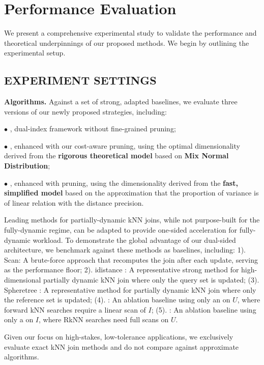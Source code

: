 \section{Performance Evaluation} \label{sec:exp}
We present a comprehensive experimental study to validate the performance and theoretical underpinnings of our proposed methods. We begin by outlining the experimental setup.

\subsection{EXPERIMENT SETTINGS}

\noindent \textbf{Algorithms.} Against a set of strong, adapted baselines, we evaluate three versions of our newly proposed strategies, including:

\noindent $\bullet$ \textbf{\dualtree},  dual-index framework without fine-grained pruning;

\noindent $\bullet$ \textbf{\dualtreeopt}, \dualtree enhanced with our cost-aware pruning, using the optimal dimensionality derived from the \textbf{rigorous theoretical model} based on \textbf{Mix Normal Distribution};

\noindent $\bullet$ \textbf{\dualtreefast}, \dualtree enhanced with pruning, using the dimensionality derived from the \textbf{fast, simplified model} based on the approximation that the proportion of variance is of linear relation with the distance precision.

Leading methods for partially-dynamic kNN joins, while not purpose-built for the fully-dynamic regime, can be adapted to provide one-sided acceleration for fully-dynamic workload. To demonstrate the global advantage of our dual-sided architecture, we benchmark against these methods as baselines, including: 1). Scan: A brute-force approach that recomputes the join after each update, serving as the performance floor; 2). idistance \cite{jagadish2005idistance}: A representative strong method for high-dimen\-sional partially dynamic kNN join where only the query set is updated; (3). Spheretree \cite{yang2014continuous}: A representative method for partially dynamic kNN join where only the reference set is updated; (4). \hdrtree \cite{ukey2022efficient}: An ablation baseline using only an \hdrtree on $U$, where forward kNN searches require a linear scan of $I$; (5). \deltatree \cite{cui2003contorting}: An ablation baseline using only a \deltatree on $I$, where RkNN searches need full scans on $U$.

Given our focus on high-stakes, low-tolerance applications, we exclusively evaluate exact kNN join methods and do not compare against approximate algorithms.

